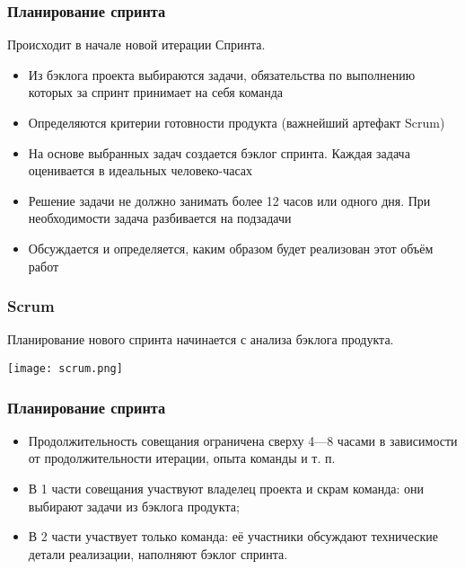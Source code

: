 \documentclass{../industrial-development}
\begin{document}
\begin{frame} \frametitle {Планирование спринта}
Происходит в начале новой итерации Спринта.
\begin{itemize}
\item Из бэклога проекта выбираются задачи, обязательства по выполнению которых за спринт принимает на себя команда
\item Определяются \alert{критерии готовности} продукта (важнейший артефакт Scrum)
\item На основе выбранных задач создается бэклог спринта. Каждая задача оценивается в идеальных человеко-часах
\item Решение задачи не должно занимать более 12 часов или одного дня. При необходимости задача разбивается на подзадачи
\item Обсуждается и определяется, каким образом будет реализован этот объём работ
\end{itemize}
\end{frame}

\begin{frame} \frametitle{Scrum}
Планирование нового спринта начинается с анализа бэклога продукта.
\centerline{\texttt{[image: scrum.png]}}
\end{frame} 

\begin{frame} \frametitle {Планирование спринта}

\begin{itemize}
\item Продолжительность совещания ограничена сверху 4---8 часами в зависимости от продолжительности итерации, опыта команды и т. п.
\item В 1 части совещания участвуют \alert {владелец проекта} и \alert{скрам команда}: они выбирают задачи из бэклога продукта;
\item В 2 части участвует \alert{только команда}: её участники обсуждают технические детали реализации, наполняют бэклог спринта.
\end {itemize}
\end{frame}
\end{document}

